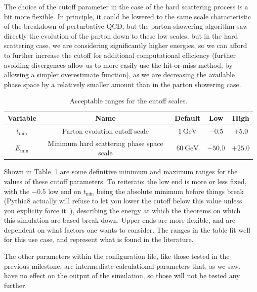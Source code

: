 The choice of the cutoff parameter in the case of the hard scattering process is a bit more flexible. In principle, it could be lowered to the same scale characteristic of the breakdown of perturbative QCD, but the parton showering algorithm saw directly the evolution of the parton down to these low scales, but in the hard scattering case, we are considering significantly higher energies, so we can afford to further increase the cutoff for additional computational efficiency (further avoiding divergences allow us to more easily use the hit-or-miss method, by allowing a simpler overestimate function), as we are decreasing the available phase space by a relatively smaller amount than in the parton showering case.

\begin{table}[h]
  \centering
  \begin{tabular}{|c|c|c|c|c|}
    \hline
    Variable & Name & Default & Low & High \\ \hline
    $t_{\mathrm{min}}$ & Parton evolution cutoff scale & $\qty{1}{\giga\electronvolt}$ & $-0.5$ & $+5.0$ \\ \hline
    $E_{\mathrm{min}}$ & Minimum hard scattering phase space scale & $\qty{60}{\giga\electronvolt}$ & $-50.0$ & $+25.0$ \\ \hline
  \end{tabular}
  \caption{Acceptable ranges for the cutoff scales.}
  \label{tbl:input-params}
\end{table}

Shown in Table~\ref{tbl:input-params} are some definitive minimum and maximum ranges for the values of these cutoff parameters. To reiterate: the low end is more or less fixed, with the $-0.5$ low end on $t_{\mathrm{min}}$ being the absolute minimum before things break (Pythia8 actually will refuse to let you lower the cutoff below this value unless you explicity force it~\cite{PYTHIA8DOC}), describing the energy at which the theorems on which this simulation are based break down. Upper ends are more flexible, and are dependent on what factors one wants to consider. The ranges in the table fit well for this use case, and represent what is found in the literature.

The other parameters within the configuration file, like those tested in the previous milestone, are intermediate calculational parameters that, as we saw, have no effect on the output of the simulation, so those will not be tested any further.



